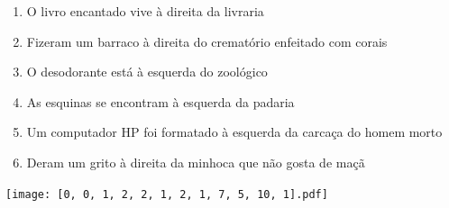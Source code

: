 \documentclass[12pt]{article}
\begin{document}
		 

\pagebreak


	\begin{enumerate}
		  \sffamily %
		  \large %


\vfill \item
O livro encantado vive	%
à direita
da livraria	%

\vfill \item
Fizeram um barraco	%
à direita
do crematório enfeitado com corais	%

\vfill \item
O desodorante está	%
à esquerda
do zoológico	%

\vfill \item
As esquinas se encontram	%
à esquerda
da padaria	%

\vfill \item
Um computador HP foi formatado	%
à esquerda
da carcaça do homem morto	%

\vfill \item
Deram um grito	%
à direita
da minhoca que não gosta de maçã	%
	\end{enumerate}
		  
		  \hfill

		  \vfill

\texttt{[image: [0, 0, 1, 2, 2, 1, 2, 1, 7, 5, 10, 1].pdf]}


	\hfill	  	  


\pagebreak			
\end{document}
